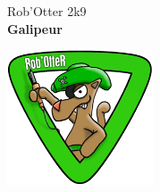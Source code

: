 \vfill

\hspace{-1.5em}\hrulefill
\begin{center}
	\Large{Rob'Otter 2k9}\\
	\vspace{1cm}
	\textbf{\huge{Galipeur}}\\
\end{center}
\hrulefill

\begin{center}
\includegraphics[height=4cm]{imgs/beta}
\end{center}

\vfill

\thispagestyle{empty}
